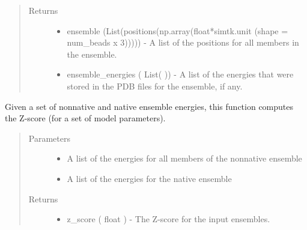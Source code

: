 \documentclass[letterpaper,12pt,english,openany,oneside]{sphinxmanual}
\begin{document}
\begin{fulllineitems}
\begin{quote}
\begin{description}
\begin{itemize}
\end{itemize}

\item[{Returns}] \leavevmode
\begin{itemize}
\item {} 
ensemble (List(positions(np.array(float*simtk.unit (shape = num\_beads x 3))))) - A list of the positions for all members in the ensemble.

\item {} 
ensemble\_energies ( List( )) - A list of the energies that were stored in the PDB files for the ensemble, if any.

\end{itemize}


\end{description}\end{quote}

\end{fulllineitems}


\begin{fulllineitems}
\label{\detokenize{ensembles:ensembles.ens_build.z_score}}
Given a set of nonnative and native ensemble energies, this function computes the Z-score (for a set of model parameters).
\begin{quote}\begin{description}
\item[{Parameters}] \leavevmode\begin{itemize}
\item {} 
 \textendash{} A list of the energies for all members of the nonnative ensemble

\item {} 
 \textendash{} A list of the energies for the native ensemble

\end{itemize}

\item[{Returns}] \leavevmode
\begin{itemize}
\item {} 
z\_score ( float ) - The Z-score for the input ensembles.

\end{itemize}


\end{description}\end{quote}

\end{fulllineitems}
\end{document}
